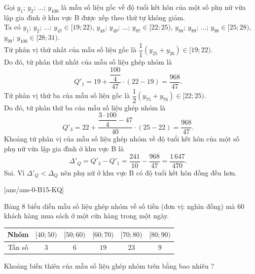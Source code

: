\begin{ex}
{\begin{itemchoice}
Gọi $y_1$; $y_2$; $\ldots$; $y_{100}$ là mẫu số liệu gốc về độ tuổi kết hôn của một số phụ nữ vừa lập gia đình ở khu vực B được xếp theo thứ tự không giảm.\\
Ta có $y_1$; $y_2$; $\ldots$; $y_{47} \in [19; 22)$, $y_{48}$; $y_{49}$; $\ldots$; $y_{87} \in [22; 25)$, $y_{88}$; $y_{89}$; $\ldots$; $y_{98} \in [25; 28)$, $y_{99}$; $y_{100} \in [28; 31)$.\\
Tứ phân vị thứ nhất của mẫu số liệu gốc là $\dfrac{1}{1}(y_{25}+y_{26}) \in [19; 22)$.\\
Do đó, tứ phân thứ nhất của mẫu số liệu ghép nhóm là $$Q'_1 = 19 + \dfrac{\dfrac{100}{4}}{47}\cdot (22-19)=\dfrac{968}{47}.$$
Tứ phân vị thứ ba của mẫu số liệu gốc là $\dfrac{1}{2}(y_{75}+y_{76})\in[22; 25)$.\\
Do đó, tứ phân thứ ba của mẫu số liệu ghép nhóm là $$Q'_3=22+\dfrac{\dfrac{3\cdot100}{4}-47}{40}\cdot (25-22)=\dfrac{968}{47}.$$
Khoảng tứ phân vị của mẫu số liệu ghép nhóm về độ tuổi kết hôn của một số phụ nữ vừa lập gia đình ở khu vực B là $$\Delta'_Q = Q'_3-Q'_1=\dfrac{241}{10}-\dfrac{968}{47}=\dfrac{1\,647}{470}.$$
\itemch Sai. Vì $\Delta'_Q < \Delta_Q$ nên phụ nữ ở khu vực B có độ tuổi kết hôn đồng đều hơn.
\end{itemchoice}
}
\end{ex}
[ans/ans-0-B15-KQ]
\caukq
\begin{ex}%
	Bảng $8$ biểu diễn mẫu số liệu ghép nhóm về số tiền (đơn vị: nghìn đồng) mà $60$ khách hàng mua sách ở một cửa hàng trong một ngày.
	\begin{center}
		\begin{tabular}{|c|c|c|c|c|c|}
	\hline Nhóm  &$[40 ; 50)$ & {$[50 ; 60)$} & {$[60 ; 70)$} &	{$[70 ; 80)$} &	{$[80 ; 90)$} \\
	\hline Tần số & $3$ & $6$ & $19$ & $23$ &$9$\\
	\hline
\end{tabular}
	\end{center}
Khoảng biến thiên của mẫu số liệu ghép nhóm trên bằng bao nhiêu ?
\end{ex}
